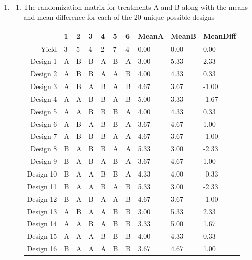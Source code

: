 \documentclass{article}
\begin{document}



\begin{enumerate}
  \item
    \begin{enumerate}
      \item The randomization matrix for treatments A and B along with the means and mean difference for each of the 20 unique possible designs 
\begin{table}[ht]
\centering
\begin{tabular}{r|lllllllll}
  \hline
 & 1 & 2 & 3 & 4 & 5 & 6 & MeanA & MeanB & MeanDiff \\ 
  \hline
Yield & 3 & 5 & 4 & 2 & 7 & 4 & 0.00 & 0.00 & 0.00 \\ 
  Design 1 & A & B & B & A & B & A & 3.00 & 5.33 & 2.33 \\ 
  Design 2 & A & B & B & A & A & B & 4.00 & 4.33 & 0.33 \\ 
  Design 3 & A & B & A & B & A & B & 4.67 & 3.67 & -1.00 \\ 
  Design 4 & A & A & B & B & A & B & 5.00 & 3.33 & -1.67 \\ 
  Design 5 & A & A & B & B & B & A & 4.00 & 4.33 & 0.33 \\ 
  Design 6 & A & B & A & B & B & A & 3.67 & 4.67 & 1.00 \\ 
  Design 7 & A & B & B & B & A & A & 4.67 & 3.67 & -1.00 \\ 
  Design 8 & B & A & B & B & A & A & 5.33 & 3.00 & -2.33 \\ 
  Design 9 & B & A & B & A & B & A & 3.67 & 4.67 & 1.00 \\ 
  Design 10 & B & A & A & B & B & A & 4.33 & 4.00 & -0.33 \\ 
  Design 11 & B & A & A & B & A & B & 5.33 & 3.00 & -2.33 \\ 
  Design 12 & B & A & B & A & A & B & 4.67 & 3.67 & -1.00 \\ 
  Design 13 & A & B & A & A & B & B & 3.00 & 5.33 & 2.33 \\ 
  Design 14 & A & A & B & A & B & B & 3.33 & 5.00 & 1.67 \\ 
  Design 15 & A & A & A & B & B & B & 4.00 & 4.33 & 0.33 \\ 
  Design 16 & B & A & A & A & B & B & 3.67 & 4.67 & 1.00 \\ 

\end{tabular}
\end{table}
\end{enumerate}
\end{enumerate}
\end{document}
